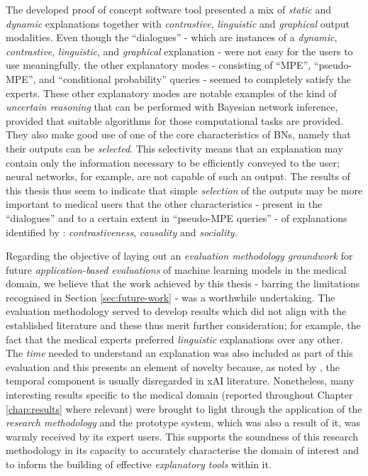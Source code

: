 The developed proof of concept software tool presented a mix of \textit{static} and \textit{dynamic} explanations together with \textit{contrastive}, \textit{linguistic} and \textit{graphical} output modalities.
Even though the \enquote{dialogues} - which are instances of a \textit{dynamic}, \textit{contrastive}, \textit{linguistic}, and \textit{graphical} explanation - were not easy for the users to use meaningfully, the other explanatory modes - consisting of \enquote{MPE}, \enquote{pseudo-MPE}, and \enquote{conditional probability} queries - seemed to completely satisfy the experts.
These other explanatory modes are notable examples of the kind of \textit{uncertain reasoning} that can be performed with Bayesian network inference, provided that suitable algorithms for those computational tasks are provided.
They also make good use of one of the core characteristics of BNs, namely that their outputs can be \textit{selected}.
This selectivity means that an explanation may contain only the information necessary to be efficiently conveyed to the user; neural networks, for example, are not capable of such an output.
The results of this thesis thus seem to indicate that simple \textit{selection} of the outputs may be more important to medical users that the other characteristics - present in the \enquote{dialogues} and to a certain extent in \enquote{pseudo-MPE queries} - of explanations identified by \citet{miller2018explanation}: \textit{contrastiveness}, \textit{causality} and \textit{sociality}.

Regarding the objective of laying out an \textit{evaluation methodology groundwork} for future \textit{application-based evaluations} of machine learning models in the medical domain, we believe that the work achieved by this thesis - barring the limitations recognised in Section \ref{sec:future-work} - was a worthwhile undertaking.
The evaluation methodology served to develop results which did not align with the established literature and these thus merit further consideration; for example, the fact that the medical experts preferred \textit{linguistic} explanations over any other.
The \textit{time} needed to understand an explanation was also included as part of this evaluation and this presents an element of novelty because, as noted by \citet{gilpin2018explaining}, the temporal component is usually disregarded in xAI literature.
Nonetheless, many interesting results specific to the medical domain (reported throughout Chapter \ref{chap:results} where relevant) were brought to light through the application of the \textit{research methodology} and the prototype system, which was also a result of it, was warmly received by its expert users.
This supports the soundness of this research methodology in its capacity to accurately characterise the domain of interest and to inform the building of effective \textit{explanatory tools} within it.